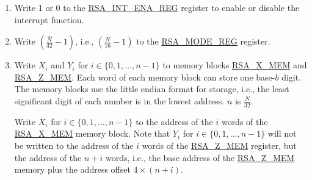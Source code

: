 \documentclass[main\_\_EN.tex]{subfiles}
\begin{document}
\begin{enumerate}

    \item Write 1 or 0 to the \hyperref[regdesc:RSAINTENAREG]{RSA\_INT\_ENA\_REG} register to enable or disable the interrupt function.

    \item Write \begin{math}( \frac{\hat{N}}{32} - 1 )\end{math}, i.e., \begin{math}( \frac{N}{16} - 1 )\end{math} to the \hyperref[regdesc:RSAMODEREG]{RSA\_MODE\_REG} register.

    \item Write \begin{math}{X}_{i}\end{math} and \begin{math}{Y}_{i}\end{math} for \begin{math}i \in \{ 0, 1, \dots, n-1 \} \end{math} to memory blocks \hyperref[tab:rsa-mem]{RSA\_X\_MEM} and \hyperref[tab:rsa-mem]{RSA\_Z\_MEM}. Each word of each memory block can store one base-\begin{math}b\end{math} digit. The memory blocks use the little endian format for storage, i.e., the least significant digit of each number is in the lowest address. \begin{math}n\end{math} is \begin{math} \frac{N}{32} \end{math}.

         Write \begin{math}{X}_{i}\end{math} for \begin{math}i \in \{ 0, 1, \dots, n-1 \} \end{math} to the address of the \begin{math}i\end{math} words of the \hyperref[tab:rsa-mem]{RSA\_X\_MEM} memory block. Note that \begin{math}{Y}_{i}\end{math} for \begin{math}i \in \{ 0, 1, \dots, n-1 \} \end{math} will not be written to the address of the \begin{math}i\end{math} words of the \hyperref[tab:rsa-mem]{RSA\_Z\_MEM} register, but the address of the \begin{math}n+i\end{math} words, i.e., the base address of the \hyperref[tab:rsa-mem]{RSA\_Z\_MEM} memory plus the address offset \begin{math}4 \times (n+i) \end{math}.


\end{enumerate}
\end{document}
